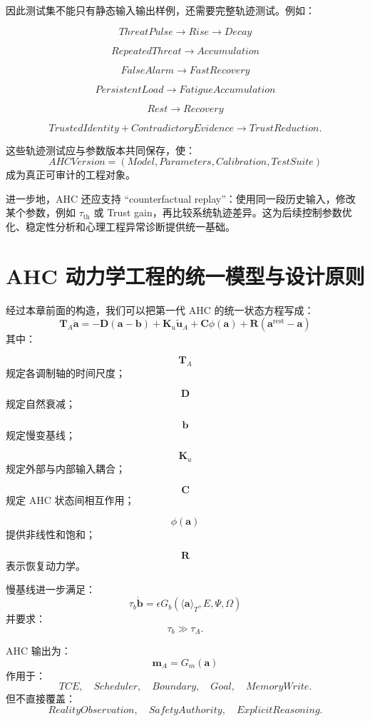 因此测试集不能只有静态输入输出样例，还需要完整轨迹测试。例如：

\[
ThreatPulse
\rightarrow
Rise
\rightarrow
Decay
\]

\[
RepeatedThreat
\rightarrow
Accumulation
\]

\[
FalseAlarm
\rightarrow
FastRecovery
\]

\[
PersistentLoad
\rightarrow
FatigueAccumulation
\]

\[
Rest
\rightarrow
Recovery
\]

\[
TrustedIdentity
+
ContradictoryEvidence
\rightarrow
TrustReduction.
\]

这些轨迹测试应与参数版本共同保存，使：
\[
AHCVersion
=
(
Model,
Parameters,
Calibration,
TestSuite
)
\]
成为真正可审计的工程对象。

进一步地，AHC 还应支持 ``counterfactual replay''：使用同一段历史输入，修改某个参数，例如 $\tau_{\mathrm{th}}$ 或 Trust gain，再比较系统轨迹差异。这为后续控制参数优化、稳定性分析和心理工程异常诊断提供统一基础。


\section{AHC 动力学工程的统一模型与设计原则}

经过本章前面的构造，我们可以把第一代 AHC 的统一状态方程写成：
\[
\boxed{
\mathbf T_A\dot{\mathbf a}
=
-\mathbf D
(
\mathbf a-\mathbf b
)
+
\mathbf K_u
\tilde{\mathbf u}_A
+
\mathbf C
\phi(\mathbf a)
+
\mathbf R
(
\mathbf a^{\mathrm{rest}}-\mathbf a
)
}
\]
其中：

\[
\mathbf T_A
\]
规定各调制轴的时间尺度；

\[
\mathbf D
\]
规定自然衰减；

\[
\mathbf b
\]
规定慢变基线；

\[
\mathbf K_u
\]
规定外部与内部输入耦合；

\[
\mathbf C
\]
规定 AHC 状态间相互作用；

\[
\phi(\mathbf a)
\]
提供非线性和饱和；

\[
\mathbf R
\]
表示恢复动力学。

慢基线进一步满足：
\[
\boxed{
\tau_b\dot{\mathbf b}
=
\epsilon
G_b(
\langle\mathbf a\rangle_T,
E,
\Psi,
\Omega
)
}
\]
并要求：
\[
\tau_b
\gg
\tau_A.
\]

AHC 输出为：
\[
\boxed{
\mathbf m_A
=
G_m(\mathbf a)
}
\]
作用于：
\[
TCE,\quad
Scheduler,\quad
Boundary,\quad
Goal,\quad
MemoryWrite.
\]
但不直接覆盖：
\[
RealityObservation,
\quad
SafetyAuthority,
\quad
ExplicitReasoning.
\]

